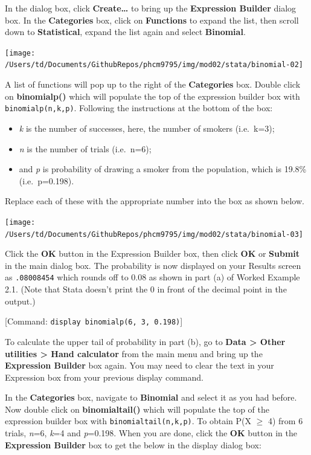 \documentclass[
]{memoir}
\providecommand{\tightlist}{%
  \setlength{\itemsep}{0pt}\setlength{\parskip}{0pt}}
\begin{document}
In the dialog box, click \textbf{Create\ldots{}} to bring up the \textbf{Expression Builder} dialog box. In the \textbf{Categories} box, click on \textbf{Functions} to expand the list, then scroll down to \textbf{Statistical}, expand the list again and select \textbf{Binomial}.

\texttt{[image: /Users/td/Documents/GithubRepos/phcm9795/img/mod02/stata/binomial-02]}

A list of functions will pop up to the right of the \textbf{Categories} box. Double click on \textbf{binomialp()} which will populate the top of the expression builder box with \texttt{binomialp(n,k,p)}. Following the instructions at the bottom of the box:

\begin{itemize}
\tightlist
\item
  \emph{k} is the number of successes, here, the number of smokers (i.e.~k=3);
\item
  \emph{n} is the number of trials (i.e.~n=6);
\item
  and \emph{p} is probability of drawing a smoker from the population, which is 19.8\% (i.e.~p=0.198).
\end{itemize}

Replace each of these with the appropriate number into the box as shown below.

\texttt{[image: /Users/td/Documents/GithubRepos/phcm9795/img/mod02/stata/binomial-03]}

Click the \textbf{OK} button in the Expression Builder box, then click \textbf{OK} or \textbf{Submit} in the main dialog box. The probability is now displayed on your Results screen as \texttt{.08008454} which rounds off to 0.08 as shown in part (a) of Worked Example 2.1. (Note that Stata doesn't print the 0 in front of the decimal point in the output.)

{[}Command: \texttt{display\ binomialp(6,\ 3,\ 0.198)}{]}

To calculate the upper tail of probability in part (b), go to \textbf{Data \textgreater{} Other utilities \textgreater{} Hand calculator} from the main menu and bring up the \textbf{Expression Builder} box again. You may need to clear the text in your Expression box from your previous display command.

In the \textbf{Categories} box, navigate to \textbf{Binomial} and select it as you had before. Now double click on \textbf{binomialtail()} which will populate the top of the expression builder box with \texttt{binomialtail(n,k,p)}. To obtain P(X \(\ge\) 4) from 6 trials, \emph{n}=6, \emph{k}=4 and \emph{p}=0.198. When you are done, click the \textbf{OK} button in the \textbf{Expression Builder} box to get the below in the display dialog box:
\end{document}
